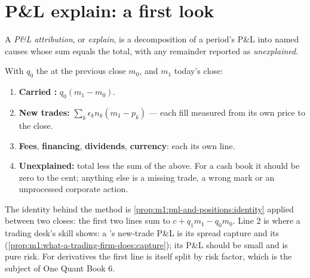 \section{P\&L explain: a first look}

\begin{definition}[P\&L attribution]\label{def:m1:pnl-and-positions:attribution}
A \emph{P\&L attribution}, or \emph{explain}, is a
decomposition of a period's P\&L into named causes whose sum equals the
total, with any remainder reported as \emph{unexplained}.
\end{definition}

\begin{method}\label{met:m1:pnl-and-positions:explain}
With $q_0$ the  at the previous close $m_0$, and $m_1$ today's close:
\begin{enumerate}
\item \textbf{Carried :} $q_0(m_1 - m_0)$.
\item \textbf{New trades:} $\sum_k \epsilon_k n_k (m_1 - p_k)$ --- each fill
  measured from its own price to the close.
\item \textbf{Fees}, \textbf{financing}, \textbf{dividends},
  \textbf{currency}: each its own line.
\item \textbf{Unexplained:} total less the sum of the above. For a cash book
  it should be zero to the cent; anything else is a missing trade, a wrong
  mark or an unprocessed corporate action.
\end{enumerate}
\end{method}

The identity behind the method is
\cref{prop:m1:pnl-and-positions:identity} applied between two closes: the
first two lines sum to $c + q_1 m_1 - q_0 m_0$. Line 2 is where a trading
desk's skill shows: a 's new-trade P\&L is its spread capture and
its  (\cref{prop:m1:what-a-trading-firm-does:capture}); its
 P\&L should be small and is pure risk. For derivatives the
first line is itself split by risk factor, which is the subject of One Quant
Book 6.

